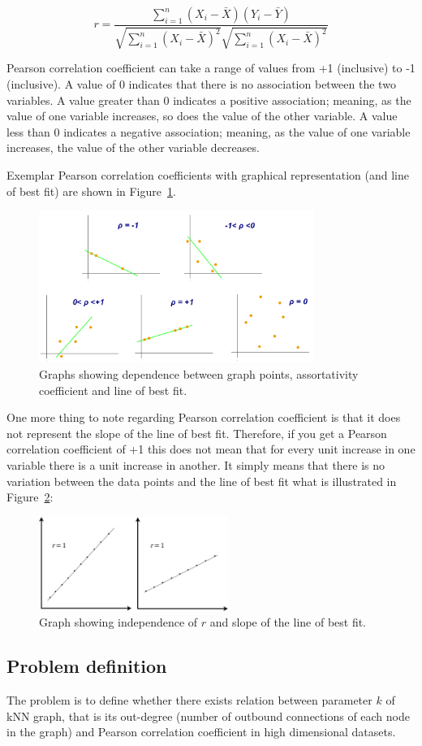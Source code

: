 $$r = \frac{\sum_{i=1}^{n} (X_i - \bar{X}) (Y_i - \bar{Y}) }
{ \sqrt{\sum_{i=1}^{n} (X_i - \bar{X})^2} \sqrt{\sum_{i=1}^{n} (X_i - \bar{X})^2} }$$

Pearson correlation coefficient can take a range of values from +1 (inclusive) to -1 (inclusive).
A value of 0 indicates that there is no association between the two variables.
A value greater than 0 indicates a positive association; meaning, as the value of one variable increases, so does the value of the other variable.
A value less than 0 indicates a negative association; meaning, as the value of one variable increases, the value of the other variable decreases.

\clearpage
Exemplar Pearson correlation coefficients with graphical representation (and line of best fit) are shown in Figure~\ref{fig:pearson_graph}.

\begin{figure}[h!]
  \centering
  \captionsetup{justification=centering}
    \includegraphics[width=0.8\textwidth]{images/pearson_graphs.png}
  \caption{Graphs showing dependence between graph points, assortativity coefficient and line of best fit.\cite{wiki_pearson}}
  \label{fig:pearson_graph}
\end{figure}

One more thing to note regarding Pearson correlation coefficient is that it does not represent the slope of the line of best fit.
Therefore, if you get a Pearson correlation coefficient of +1 this does not mean that for every unit increase in one variable there is a unit increase in another.
It simply means that there is no variation between the data points and the line of best fit what is illustrated in Figure~\ref{fig:pearson_graph_slope}:

\begin{figure}[h!]
  \centering
  \captionsetup{width=24pc, justification=centering}
    \includegraphics[width=0.55\textwidth]{images/pearson_graphs_slope.png}
  \caption{Graph showing independence of $r$ and slope of the line of best fit.}
  \label{fig:pearson_graph_slope}
\end{figure}

\subsection{Problem definition}
The problem is to define whether there exists relation between parameter $k$ of kNN graph, that is its out-degree (number of outbound connections of each node in the graph) and Pearson correlation coefficient in high dimensional datasets.

